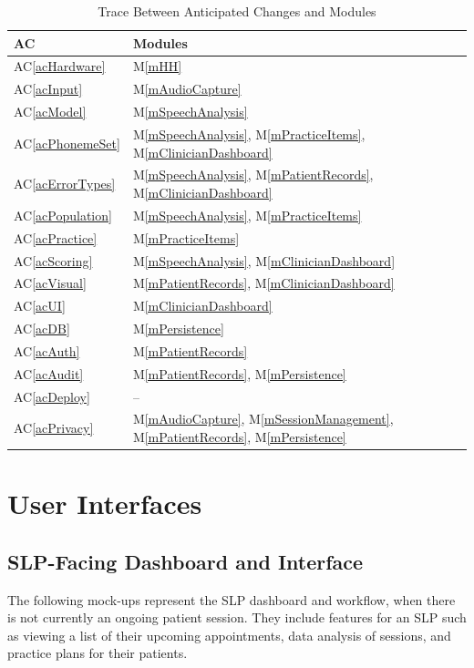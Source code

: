 \documentclass[12pt, titlepage]{article}
\newcommand{\acref}[1]{AC\ref{#1}}
\newcommand{\mref}[1]{M\ref{#1}}
\begin{document}
\begin{table}[H]
\centering
\begin{tabular}{p{} p{}}
\toprule
\textbf{AC} & \textbf{Modules}\\
\midrule
\acref{acHardware} & \mref{mHH}\\
\acref{acInput} & \mref{mAudioCapture}\\
\acref{acModel} & \mref{mSpeechAnalysis}\\
\acref{acPhonemeSet} & \mref{mSpeechAnalysis}, \mref{mPracticeItems}, \mref{mClinicianDashboard}\\
\acref{acErrorTypes} & \mref{mSpeechAnalysis}, \mref{mPatientRecords}, \mref{mClinicianDashboard}\\
\acref{acPopulation} & \mref{mSpeechAnalysis}, \mref{mPracticeItems}\\
\acref{acPractice} & \mref{mPracticeItems}\\
\acref{acScoring} & \mref{mSpeechAnalysis}, \mref{mClinicianDashboard}\\
\acref{acVisual} &  \mref{mPatientRecords}, \mref{mClinicianDashboard}\\
\acref{acUI} & \mref{mClinicianDashboard}\\
\acref{acDB} & \mref{mPersistence}\\
\acref{acAuth} & \mref{mPatientRecords}\\
\acref{acAudit} & \mref{mPatientRecords}, \mref{mPersistence}\\
\acref{acDeploy} & --\\
\acref{acPrivacy} & \mref{mAudioCapture}, \mref{mSessionManagement}, \mref{mPatientRecords}, \mref{mPersistence}\\
\bottomrule
\end{tabular}
\caption{Trace Between Anticipated Changes and Modules}
\label{TblACT}
\end{table}

\section{User Interfaces}

\subsection{SLP-Facing Dashboard and Interface}

The following mock-ups represent the SLP dashboard and workflow, when there is not currently an ongoing patient session. They include features for an SLP such as viewing a list of their upcoming appointments, data analysis of sessions, and practice plans for their patients.
\end{document}
